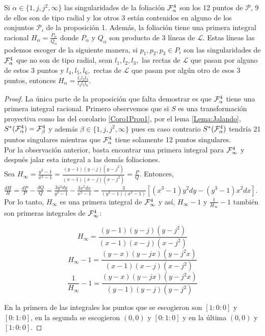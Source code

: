 \begin{Proposicion}
\label{Prop:3}
Si $\alpha\in\{1,j,j^2,\infty\}$ las singularidades de la foliación $\Fol[4]{\alpha}$ son los 12 puntos de $\mathcal{P}$, 9 de ellos son de tipo radial y los otros 3 están contenidos en alguno de los conjuntos $\mathcal{P}_i$ de la proposición 1. Además, la foliación tiene una primera integral racional $H_\alpha=\tfrac{P_\alpha}{Q_\alpha}$ donde $P_\alpha$ y $Q_\alpha$ son producto de 3 líneas de $\mathcal{L}$. Estas líneas las podemos escoger de la siguiente manera, si $p_1,p_2,p_3\in\mathit{P}_i$ son las singularidades de $\Fol[4]{\alpha}$ que no son de tipo radial, sean $\mathit{l}_1, \mathit{l}_2, \mathit{l}_3,$ las rectas de $\mathcal{L}$ que pasan por alguno de estos 3 puntos y $\mathit{l}_4, \mathit{l}_5, \mathit{l}_6,$ rectas de $\mathcal{L}$ que pasan por algún otro de esos 3 puntos, entonces $H_\alpha=\tfrac{\mathit{l}_1\mathit{l}_2\mathit{l}_3}{\mathit{l}_4\mathit{l}_5\mathit{l}_6}$.
\end{Proposicion}

\begin{proof}
La única parte de la proposición que falta demostrar es que $\Fol[4]{\alpha}$ tiene una primera integral racional. Primero observemos que si $S$ es una transformación proyectiva como las del corolario \ref{Coro1Prop1}, por el lema \ref{Lema:Jalando}, $S^*(\Fol[4]{\alpha})=\Fol[4]{\beta}$ y además $\beta\in\{1,j,j^2,\infty\}$ pues en caso contrario $S^*(\Fol[4]{\alpha})$ tendría 21 puntos singulares mientras que $\Fol[4]{\alpha}$ tiene solamente 12 puntos singulares.
\\

Por la observación anterior, basta encontrar una primera integral para $\Fol[4]{\infty}$ y después jalar esta integral a las demás foliaciones.
\\

Sea $H_\infty = \tfrac{y^3-1}{x^3-1} = \tfrac{(y-1)(y-j)(y-j^2)}{(x-1)(x-j)(x-j^2)} = \tfrac{P}{Q}$. Entonces, $\tfrac{dH}{H} = \tfrac{dP}{P} - \tfrac{dQ}{Q} = \tfrac{3y^2dy}{y^3-1} - \tfrac{3x^2dx}{x^3-1} = \tfrac{3}{(y^3-1)(x^3-1)}[(x^3-1)y^2dy - (y^3-1)x^2dx]$. Por lo tanto, $H_\infty$ es una primera integral de $\Fol[4]{\infty}$ y así, $H_\infty - 1$ y $\tfrac{1}{H_\infty} - 1$ también son primeras integrales de $\Fol[4]{\infty}$:

$$H_\infty = \frac{(y-1)(y-j)(y-j^2)}{(x-1)(x-j)(x-j^2)}$$
$$H_\infty - 1 = \frac{(y-x)(y-jx)(y-j^2x)}{(x-1)(x-j)(x-j^2)}$$
$$\frac{1}{H_\infty} - 1 = \frac{(y-x)(y-jx)(y-j^2x)}{(y-1)(y-j)(y-j^2)}$$

En la primera de las integrales los puntos que se escogieron son $[1:0:0]$ y $[0:1:0]$, en la segunda se escogieron $(0,0)$ y $[0:1:0]$ y en la última $(0,0)$ y $[1:0:0]$.
\end{proof}

